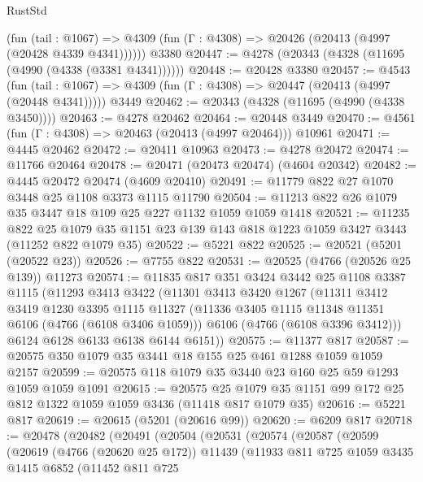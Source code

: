 \begin{lexlean}{RustStd}
\begin{coremodule}
{\begin{coremodule}
{{{{{{{{{{{{{{{{{{{{{{{{{{{{{{{{{{{      (fun (tail : @1067) =>
      @4309 (fun (Γ : @4308) => @20426 (@20413 (@4997 (@20428 @4339 @4341))))))
    @3380
@20447 := @4278 (@20343 (@4328 (@11695 (@4990 (@4338 (@3381 @4341))))))
@20448 := @20428 @3380
@20457 := @4543
    (fun (tail : @1067) => @4309 (fun (Γ : @4308) => @20447 (@20413 (@4997 (@20448 @4341)))))
    @3449
@20462 := @20343 (@4328 (@11695 (@4990 (@4338 @3450))))
@20463 := @4278 @20462
@20464 := @20448 @3449
@20470 := @4561 (fun (Γ : @4308) => @20463 (@20413 (@4997 @20464))) @10961
@20471 := @4445 @20462
@20472 := @20411 @10963
@20473 := @4278 @20472
@20474 := @11766 @20464
@20478 := @20471 (@20473 @20474) (@4604 @20342)
@20482 := @4445 @20472 @20474 (@4609 @20410)
@20491 := @11779 @822 @27 @1070 @3448 @25 @1108 @3373 @1115 @11790
@20504 := @11213 @822 @26 @1079 @35 @3447 @18 @109 @25 @227 @1132 @1059 @1059 @1418
@20521 := @11235
    @822
    @25
    @1079
    @35
    @1151
    @23
    @139
    @143
    @818
    @1223
    @1059
    @3427
    @3443
    (@11252 @822 @1079 @35)
@20522 := @5221 @822
@20525 := @20521 (@5201 (@20522 @23))
@20526 := @7755 @822
@20531 := @20525 (@4766 (@20526 @25 @139)) @11273
@20574 := @11835
    @817
    @351
    @3424
    @3442
    @25
    @1108
    @3387
    @1115
    (@11293
      @3413
      @3422
      (@11301
        @3413
        @3420
        @1267
        (@11311
          @3412
          @3419
          @1230
          @3395
          @1115
          @11327
          (@11336 @3405 @1115 @11348 @11351 @6106 (@4766 (@6108 @3406 @1059)))
          @6106
          (@4766 (@6108 @3396 @3412)))
        @6124
        @6128
        @6133
        @6138
        @6144
        @6151))
@20575 := @11377 @817
@20587 := @20575 @350 @1079 @35 @3441 @18 @155 @25 @461 @1288 @1059 @1059 @2157
@20599 := @20575 @118 @1079 @35 @3440 @23 @160 @25 @59 @1293 @1059 @1059 @1091
@20615 := @20575
    @25
    @1079
    @35
    @1151
    @99
    @172
    @25
    @812
    @1322
    @1059
    @1059
    @3436
    (@11418 @817 @1079 @35)
@20616 := @5221 @817
@20619 := @20615 (@5201 (@20616 @99))
@20620 := @6209 @817
@20718 := @20478
    (@20482
      (@20491
        (@20504
          (@20531
            (@20574
              (@20587
                (@20599
                  (@20619
                    (@4766 (@20620 @25 @172))
                    @11439
                    (@11933
                      @811
                      @725
                      @1059
                      @3435
                      @1415
                      @6852
                      (@11452
                        @811
                        @725
}}}}}}}}}}}}}}}}}}}}}}}}}}}}}}}}}}}
\end{coremodule}}
\end{coremodule}
\end{lexlean}
